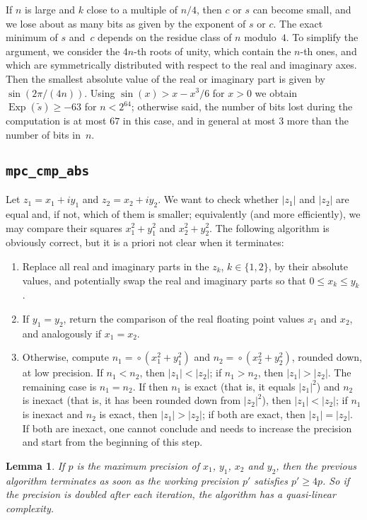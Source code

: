 \documentclass [11pt]{article}
\newcommand {\appro}[1]{\widetilde {#1}}
\DeclareMathOperator{\Exp}{\operatorname {Exp}}
\newcommand {\round}{\operatorname {\circ}}
\renewcommand {\leq}{\leqslant}
\renewcommand {\geq}{\geqslant}
\newtheorem{lemma}[theorem]{Lemma}
\begin{document}
If $n$ is large and $k$ close to a multiple of $n/4$, then $c$ or $s$
can become small, and we lose about as many bits as given by the exponent
of $s$ or $c$. The exact minimum of $s$ and~$c$ depends on the residue
class of $n$ modulo~$4$. To simplify the argument, we consider the $4 n$-th
roots of unity, which contain the $n$-th ones, and which are symmetrically
distributed with respect to the real and imaginary axes. Then the smallest
absolute value of the real or imaginary part is given by
$\sin (2 \pi / (4 n))$. Using $\sin (x) > x - x^3 / 6$ for $x > 0$
we obtain $\Exp (\appro {s}) \geq -63$ for $n < 2^{64}$; otherwise said,
the number of bits lost during the computation is at most $67$ in this
case, and in general at most $3$ more than the number of bits in~$n$.


\subsection {\texttt {mpc\_cmp\_abs}}

Let $z_1 = x_1 + i y_1$ and $z_2 = x_2 + i y_2$. We want to check whether
$|z_1|$ and $|z_2|$ are equal and, if not, which of them
is smaller; equivalently (and more efficiently), we may compare their squares
$x_1^2 + y_1^2$ and $x_2^2 + y_2^2$.
The following algorithm is obviously correct, but it is a priori not clear
when it terminates:
\begin {enumerate}
\item
Replace all real and imaginary parts in the $z_k$, $k \in \{ 1, 2 \}$, by their
absolute values, and potentially swap the real and imaginary parts so that
$0 \leq x_k \leq y_k$.
\item
If $y_1 = y_2$, return the comparison of the real floating point values
$x_1$ and $x_2$, and analogously if $x_1 = x_2$.
\item
Otherwise, compute $n_1 = \round (x_1^2 + y_1^2)$ and
$n_2 = \round (x_2^2 + y_2^2)$, rounded down, at low precision.
If $n_1 < n_2$, then $|z_1| < |z_2|$;
if $n_1 > n_2$, then $|z_1| > |z_2|$.
The remaining case is $n_1 = n_2$.
If then $n_1$ is exact (that is, it equals $|z_1|^2$) and $n_2$ is inexact
(that is, it has been rounded down from $|z_2|^2$), then $|z_1| < |z_2|$;
if $n_1$ is inexact and $n_2$ is exact, then $|z_1| > |z_2|$;
if both are exact, then $|z_1| = |z_2|$.
If both are inexact, one cannot conclude and needs to increase the precision
and start from the beginning of this step.
\end {enumerate}

\begin {lemma}
If $p$ is the maximum precision of $x_1$, $y_1$, $x_2$ and $y_2$, then the
previous algorithm terminates as soon as the working precision $p'$ satisfies
$p' \geq 4p$.
So if the precision is doubled after each iteration, the algorithm has a
quasi-linear complexity.
\end {lemma}
\end{document}
